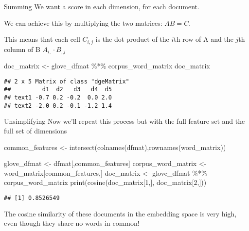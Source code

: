 \documentclass[
  10pt,
  ignorenonframetext,
  aspectratio=169]{beamer}
\newenvironment{Shaded}{\begin{snugshade}}{\end{snugshade}}
\newcommand{\DecValTok}[1]{\textcolor[rgb]{0.86,0.86,0.80}{#1}}
\newcommand{\FunctionTok}[1]{\textcolor[rgb]{0.94,0.94,0.56}{#1}}
\newcommand{\NormalTok}[1]{\textcolor[rgb]{0.80,0.80,0.80}{#1}}
\newcommand{\OtherTok}[1]{\textcolor[rgb]{0.94,0.94,0.56}{#1}}
\newcommand{\SpecialCharTok}[1]{\textcolor[rgb]{0.86,0.64,0.64}{#1}}
\begin{document}
\begin{frame}[fragile]{Summing}
\protect\hypertarget{summing}{}
We want a score in each dimension, for each document.

We can achieve this by multiplying the two matrices: \(AB = C\).

This means that each cell \(C_{i,j}\) is the dot product of the \(i\)th
row of A and the \(j\)th column of B \(A_{i,} \cdot B_{,j}\)

\medskip

\scriptsize

\begin{Shaded}
\begin{Highlighting}[]
\NormalTok{doc\_matrix }\OtherTok{\textless{}{-}}\NormalTok{ glove\_dfmat }\SpecialCharTok{\%*\%}\NormalTok{ corpus\_word\_matrix}
\NormalTok{doc\_matrix}
\end{Highlighting}
\end{Shaded}

\begin{verbatim}
## 2 x 5 Matrix of class "dgeMatrix"
##         d1  d2   d3   d4  d5
## text1 -0.7 0.2 -0.2  0.0 2.0
## text2 -2.0 0.2 -0.1 -1.2 1.4
\end{verbatim}
\end{frame}

\begin{frame}[fragile]{Unsimplifying}
\protect\hypertarget{unsimplifying}{}
Now we'll repeat this process but with the full feature set and the full
set of dimensions

\medskip

\scriptsize

\begin{Shaded}
\begin{Highlighting}[]
\NormalTok{common\_features }\OtherTok{\textless{}{-}} \FunctionTok{intersect}\NormalTok{(}\FunctionTok{colnames}\NormalTok{(dfmat),}\FunctionTok{rownames}\NormalTok{(word\_matrix))}

\NormalTok{glove\_dfmat }\OtherTok{\textless{}{-}}\NormalTok{ dfmat[,common\_features]}
\NormalTok{corpus\_word\_matrix }\OtherTok{\textless{}{-}}\NormalTok{ word\_matrix[common\_features,]}
\NormalTok{doc\_matrix }\OtherTok{\textless{}{-}}\NormalTok{ glove\_dfmat }\SpecialCharTok{\%*\%}\NormalTok{ corpus\_word\_matrix}
\FunctionTok{print}\NormalTok{(}\FunctionTok{cosine}\NormalTok{(doc\_matrix[}\DecValTok{1}\NormalTok{,], doc\_matrix[}\DecValTok{2}\NormalTok{,]))}
\end{Highlighting}
\end{Shaded}

\begin{verbatim}
## [1] 0.8526549
\end{verbatim}

\medskip

\normalsize

The cosine similarity of these documents in the embedding space is very
high, even though they share no words in common!
\end{frame}
\end{document}
